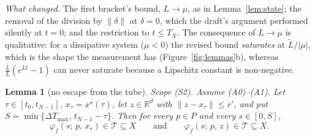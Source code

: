 \documentclass[11pt]{article}
\newtheorem{lemma}{Lemma}
\theoremstyle{remark}\newtheorem{remark}{Remark}
\newcommand{\norm}[1]{\lVert #1\rVert}
\newcommand{\flow}[3]{\varphi_f(#1;\,#2,\,#3)}
\begin{document}
\emph{What changed.} The first bracket's bound, $L\to\mu$, as in Lemma~\ref{lem:state}; the removal of the division by $\norm\delta$ at $\delta=0$, which the draft's argument performed silently at $t=0$; and the restriction to $t\le T_X$. The consequence of $L\to\mu$ is qualitative: for a dissipative system ($\mu<0$) the revised bound \emph{saturates} at $\tilde L/|\mu|$, which is the shape the measurement has (Figure~\ref{fig:lemmas}b), whereas $\frac{\tilde L}{L}(e^{Lt}-1)$ can never saturate because a Lipschitz constant is non-negative.

\begin{lemma}[no escape from the tube]\label{lem:noescape}
\emph{Scope (S2).} Assume (A0)--(A1). Let $\tau\in[t_0,t_{N-1}]$, $x_\tau=x^\star(\tau)$, let $z\in\mathbb R^{d}$ with $\norm{z-x_\tau}\le r'$, and put $S=\min\{\Delta T_{\max},\,t_{N-1}-\tau\}$. Then for every $p\in P$ and every $s\in[0,S]$,
\[
\flow{s}{p}{x_\tau}\in\mathcal T\subseteq X
\qquad\text{and}\qquad
\flow{s}{p}{z}\in\mathcal T\subseteq X .
\]
\end{lemma}
\end{document}
